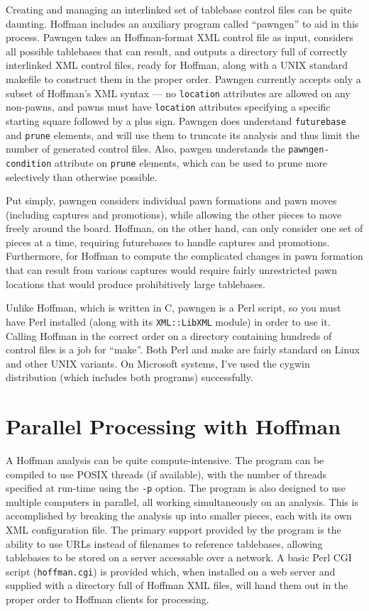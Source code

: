 \documentclass[11pt]{article}
\begin{document}
Creating and managing an interlinked set of tablebase control files
can be quite daunting.  Hoffman includes an auxiliary program called
``pawngen'' to aid in this process.  Pawngen takes an Hoffman-format
XML control file as input, considers all possible tablebases that can
result, and outputs a directory full of correctly interlinked XML
control files, ready for Hoffman, along with a UNIX standard makefile
to construct them in the proper order.  Pawngen currently accepts only
a subset of Hoffman's XML syntax --- no {\tt location} attributes are
allowed on any non-pawns, and pawns must have {\tt location}
attributes specifying a specific starting square followed by a plus
sign.  Pawngen does understand {\tt futurebase} and {\tt prune}
elements, and will use them to truncate its analysis and thus limit
the number of generated control files.  Also, pawgen understands the
{\tt pawngen-condition} attribute on {\tt prune} elements, which can
be used to prune more selectively than otherwise possible.

Put simply, pawngen considers individual pawn formations and pawn
moves (including captures and promotions), while allowing the other
pieces to move freely around the board.  Hoffman, on the other hand,
can only consider one set of pieces at a time, requiring futurebases
to handle captures and promotions.  Furthermore, for Hoffman to
compute the complicated changes in pawn formation that can result from
various captures would require fairly unrestricted pawn locations that
would produce prohibitively large tablebases.

\vfil\eject

Unlike Hoffman, which is written in C, pawngen is a Perl script, so
you must have Perl installed (along with its {\tt XML::LibXML} module)
in order to use it.  Calling Hoffman in the correct order on a
directory containing hundreds of control files is a job for ``make''.
Both Perl and make are fairly standard on Linux and other UNIX
variants.  On Microsoft systems, I've used the cygwin distribution
(which includes both programs) successfully.

\section{Parallel Processing with Hoffman}

A Hoffman analysis can be quite compute-intensive.  The program can be
compiled to use POSIX threads (if available), with the number of
threads specified at run-time using the {\tt -p} option.  The program
is also designed to use multiple computers in parallel, all working
simultaneously on an analysis.  This is accomplished by breaking the
analysis up into smaller pieces, each with its own XML configuration
file.  The primary support provided by the program is the ability to
use URLs instead of filenames to reference tablebases, allowing
tablebases to be stored on a server accessable over a network.  A
basic Perl CGI script ({\tt hoffman.cgi}) is provided which, when
installed on a web server and supplied with a directory full of
Hoffman XML files, will hand them out in the proper order to Hoffman
clients for processing.
\end{document}
